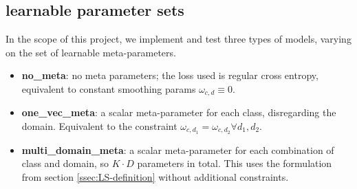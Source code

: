 \documentclass[12pt,a4paper]{article}
\begin{document}
\subsection{learnable parameter sets}
\label{ssec:learnable_psets}
In the scope of this project, we implement and test three types of models, varying on the set of learnable meta-parameters.
\begin{itemize}
	\item \textbf{no\_meta}: no meta parameters; the loss used is regular cross entropy, equivalent to constant smoothing params $\omega_{c,d}\equiv0$.
	\item \textbf{one\_vec\_meta}: a scalar meta-parameter for each class, disregarding the domain. Equivalent to the constraint $\omega_{c,d_1} = \omega_{c,d_2} \forall d_1,d_2$.
	\item \textbf{multi\_domain\_meta}: a scalar meta-parameter for each combination of class and domain, so $K\cdot D$ parameters in total. This uses the formulation from section \ref{ssec:LS-definition} without additional constraints.
\end{itemize}
\end{document}
